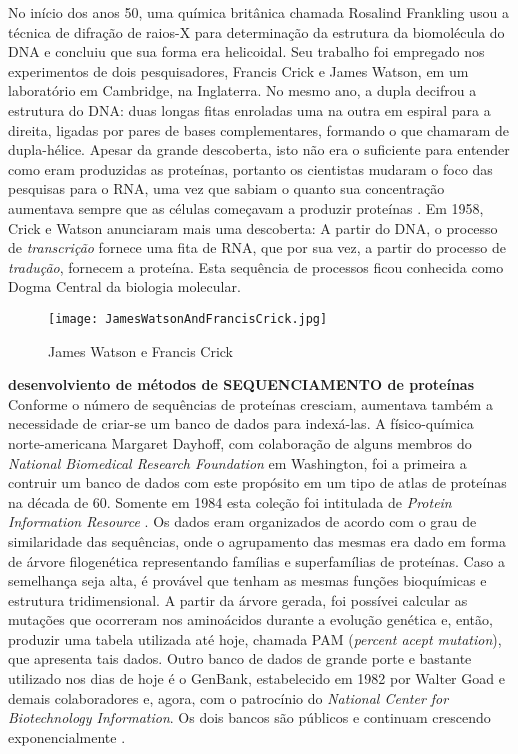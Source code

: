 \indent No início dos anos 50, uma química britânica chamada Rosalind Frankling usou a técnica de difração de raios-X para determinação da estrutura da biomolécula do DNA e concluiu que sua forma era helicoidal. Seu trabalho foi empregado nos experimentos de dois pesquisadores, Francis Crick e James Watson, em um laboratório em Cambridge, na Inglaterra. No mesmo ano, a dupla decifrou a estrutura do DNA: duas longas fitas enroladas uma na outra em espiral para a direita, ligadas por pares de bases complementares, formando o que chamaram de dupla-hélice. Apesar da grande descoberta, isto não era o suficiente para entender como eram produzidas as proteínas, portanto os cientistas mudaram o foco das pesquisas para o RNA, uma vez que sabiam o quanto sua concentração aumentava sempre que as células começavam a produzir proteínas \cite{violinist12}. Em 1958, Crick e Watson anunciaram mais uma descoberta: A partir do DNA, o processo de \textit{transcrição} fornece uma fita de RNA, que por sua vez, a partir do processo de \textit{tradução}, fornecem a proteína. Esta sequência de processos ficou conhecida como Dogma Central da biologia molecular. \\

\vspace{1cm}
 \begin{figure}[h!]
     \centering
     \texttt{[image: JamesWatsonAndFrancisCrick.jpg]}
     \caption{James Watson e Francis Crick}
     \label{fig:JamesWatsonAndFrancisCrick}
 \end{figure}
\vspace{1cm}

\indent \textbf{desenvolviento de métodos de SEQUENCIAMENTO de proteínas} \\

\indent Conforme o número de sequências de proteínas cresciam, aumentava também a necessidade de criar-se um banco de dados para indexá-las. A físico-química norte-americana Margaret Dayhoff, com colaboração de alguns membros do \textit{National Biomedical Research Foundation} em Washington, foi a primeira a contruir um banco de dados com este propósito em um tipo de atlas de proteínas na década de 60. Somente em 1984 esta coleção foi intitulada de \textit{Protein Information Resource} \cite{mount01}. Os dados eram organizados de acordo com o grau de similaridade das sequências, onde o agrupamento das mesmas era dado em forma de árvore filogenética representando famílias e superfamílias de proteínas. Caso a semelhança seja alta, é provável que tenham as mesmas funções bioquímicas e estrutura tridimensional. A partir da árvore gerada, foi possívei calcular as mutações que ocorreram nos aminoácidos durante a evolução genética e, então, produzir uma tabela utilizada até hoje, chamada PAM (\textit{percent acept mutation}), que apresenta tais dados. Outro banco de dados de grande porte e bastante utilizado nos dias de hoje é o GenBank, estabelecido em 1982 por Walter Goad e demais colaboradores e, agora, com o patrocínio do \textit{National Center for Biotechnology Information}. Os dois bancos são públicos e continuam crescendo exponencialmente \cite{mount01}.

